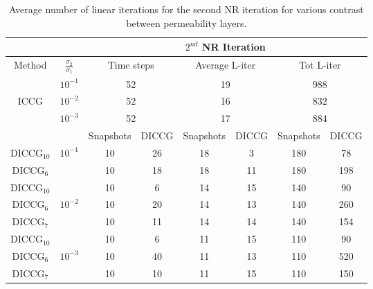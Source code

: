 \documentclass[12pt]{article}
\numberwithin{equation}{section}
\begin{document}
\begin{table}[!ht]\centering
\begin{minipage}{1\textwidth}
\vspace{-10pt}
\centering
\begin{tabular}{ |c|c|c|c|c|c|c|c|} 
  \hline
 & & \multicolumn{6}{|c|}{$2^{nd}$ NR Iteration}  \\
\hline
Method& $\frac{\sigma_2}{\sigma_1}$ & \multicolumn{2}{|c|}{Time steps} &\multicolumn{2}{|c|}{Average L-iter} & \multicolumn{2}{|c|}{Tot L-iter}\\
\hline
&$10^{-1}$ &\multicolumn{2}{|c|}{52} & \multicolumn{2}{|c|}{19}& \multicolumn{2}{|c|}{988} \\
ICCG&$10^{-2}$ & \multicolumn{2}{|c|}{52}& \multicolumn{2}{|c|}{16}& \multicolumn{2}{|c|}{832}\\
&$10^{-3}$ & \multicolumn{2}{|c|}{52} &\multicolumn{2}{|c|}{17} & \multicolumn{2}{|c|}{884}\\
\hline
&&Snapshots&DICCG&Snapshots&DICCG&Snapshots&DICCG\\
\hline
DICCG$_{10}$&$10^{-1}$ &10&26 &18&3 &180&78 \\
DICCG$_6$& &10&18 &18&11 &180&198 \\
\hline
DICCG$_{10}$& &10&6 & 14&15& 140&90\\
DICCG$_6$&$10^{-2}$ &10&20 & 14&13& 140&260\\
DICCG$_7$&&10&11 & 14&14& 140&154\\
\hline
DICCG$_{10}$& & 10&6 & 11&15&110&90 \\
DICCG$_6$&$10^{-3}$ & 10&40 & 11&13&110&520 \\
DICCG$_7$& & 10&10 & 11&15&110&150 \\
 \hline
 \end{tabular}
\caption{Average number of linear iterations for the second NR iteration for various contrast between permeability layers. }\label{table:liter2}
\end{minipage}
\end{table}
\end{document}
